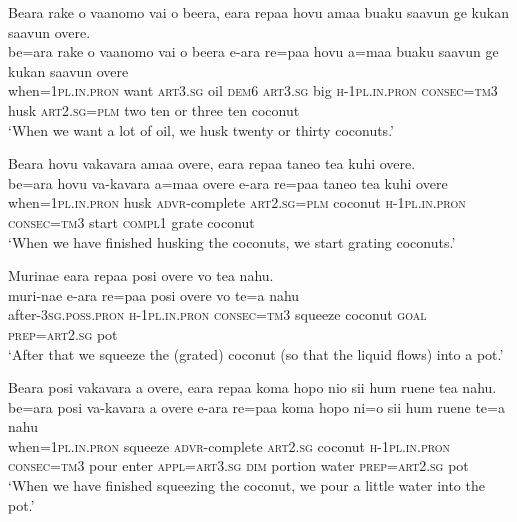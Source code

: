 \ea\label{ex:text01-125}
Beara rake o vaanomo vai o beera, eara repaa hovu amaa buaku saavun ge kukan saavun overe.\\
\gll be=ara	rake	o	vaanomo	vai	o	beera	e-ara	re=paa	hovu	a=maa	buaku	saavun	ge	kukan	saavun	overe\\
     when=1\textsc{pl}.\textsc{in}.\textsc{pron}	want	\textsc{art}3.\textsc{sg}	oil	\textsc{dem}6	\textsc{art}3.\textsc{sg}	big	\textsc{h}-1\textsc{pl}.\textsc{in}.\textsc{pron}	\textsc{consec}=\textsc{tm}3	husk	\textsc{art}2.\textsc{sg}=\textsc{plm}	two	ten	or	three	ten	coconut\\
\glt `When we want a lot of oil, we husk twenty or thirty coconuts.'
\z

\ea\label{ex:text01-126}
Beara hovu vakavara amaa overe, eara repaa taneo tea kuhi overe.\\
\gll be=ara	hovu	va-kavara	a=maa	overe	e-ara	re=paa	taneo	tea	kuhi	overe\\
     when=1\textsc{pl}.\textsc{in}.\textsc{pron}	husk	\textsc{advr}-complete	\textsc{art}2.\textsc{sg}=\textsc{plm}	coconut	\textsc{h}-1\textsc{pl}.\textsc{in}.\textsc{pron}	\textsc{consec}=\textsc{tm}3	start	\textsc{compl}1	grate	coconut\\
\glt `When we have finished husking the coconuts, we start grating coconuts.'
\z

\ea\label{ex:text01-127}
Murinae eara repaa posi overe vo tea nahu.\\
\gll muri-nae	e-ara	re=paa	posi	overe	vo	te=a	nahu\\
     after-3\textsc{sg}.\textsc{poss}.\textsc{pron}	\textsc{h}-1\textsc{pl}.\textsc{in}.\textsc{pron}	\textsc{consec}=\textsc{tm}3	squeeze	coconut	\textsc{goal}	\textsc{prep}=\textsc{art}2.\textsc{sg}	pot\\
\glt `After that we squeeze the (grated) coconut (so that the liquid flows) into a pot.'
\z

\ea\label{ex:text01-128}
Beara posi vakavara a overe, eara repaa koma hopo nio sii hum ruene tea nahu.\\
\gll be=ara	posi	va-kavara	a	overe	e-ara	re=paa	koma	hopo	ni=o	sii	hum	ruene	te=a	nahu\\
     when=1\textsc{pl}.\textsc{in}.\textsc{pron}	squeeze	\textsc{advr}-complete	\textsc{art}2.\textsc{sg}	coconut	\textsc{h}-1\textsc{pl}.\textsc{in}.\textsc{pron}	\textsc{consec}=\textsc{tm}3	pour	enter	\textsc{appl}=\textsc{art}3.\textsc{sg}	\textsc{dim}	portion	water	\textsc{prep}=\textsc{art}2.\textsc{sg}	pot\\
\glt `When we have finished squeezing the coconut, we pour a little water into the pot.'
\z

